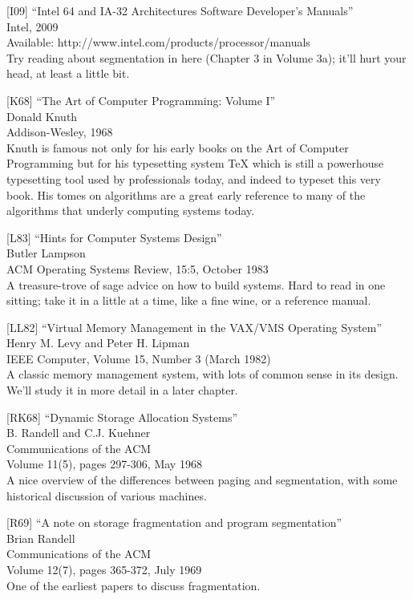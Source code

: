 {[}I09{]} ``Intel 64 and IA-32 Architectures Software Developer's
Manuals''\\
Intel, 2009\\
Available: http://www.intel.com/products/processor/manuals\\
Try reading about segmentation in here (Chapter 3 in Volume 3a); it'll
hurt your head, at least a little bit.

{[}K68{]} ``The Art of Computer Programming: Volume I''\\
Donald Knuth\\
Addison-Wesley, 1968\\
Knuth is famous not only for his early books on the Art of Computer
Programming but for his typesetting system TeX which is still a
powerhouse typesetting tool used by professionals today, and indeed to
typeset this very book. His tomes on algorithms are a great early
reference to many of the algorithms that underly computing systems
today.

{[}L83{]} ``Hints for Computer Systems Design''\\
Butler Lampson\\
ACM Operating Systems Review, 15:5, October 1983\\
A treasure-trove of sage advice on how to build systems. Hard to read in
one sitting; take it in a little at a time, like a fine wine, or a
reference manual.

{[}LL82{]} ``Virtual Memory Management in the VAX/VMS Operating
System''\\
Henry M. Levy and Peter H. Lipman\\
IEEE Computer, Volume 15, Number 3 (March 1982)\\
A classic memory management system, with lots of common sense in its
design. We'll study it in more detail in a later chapter.

{[}RK68{]} ``Dynamic Storage Allocation Systems''\\
B. Randell and C.J. Kuehner\\
Communications of the ACM\\
Volume 11(5), pages 297-306, May 1968\\
A nice overview of the differences between paging and segmentation, with
some historical discussion of various machines.

{[}R69{]} ``A note on storage fragmentation and program segmentation''\\
Brian Randell\\
Communications of the ACM\\
Volume 12(7), pages 365-372, July 1969\\
One of the earliest papers to discuss fragmentation.

